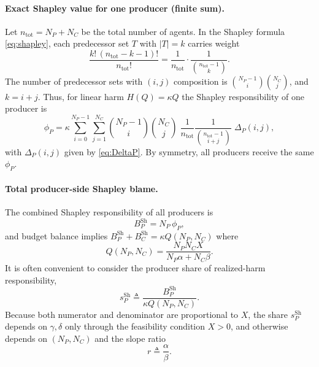 \documentclass[journal, a4paper]{IEEEtran}
\begin{document}
\paragraph{Exact Shapley value for one producer (finite sum).}
Let $n_{\mathrm{tot}}=N_P+N_C$ be the total number of agents. In the Shapley formula \eqref{eq:shapley}, each predecessor set $T$ with $|T|=k$ carries weight
\begin{equation}
\frac{k!\,(n_{\mathrm{tot}}-k-1)!}{n_{\mathrm{tot}}!}
=\frac{1}{n_{\mathrm{tot}}}\cdot\frac{1}{\binom{n_{\mathrm{tot}}-1}{k}}.
\label{eq:shapley_weight_binom}
\end{equation}
The number of predecessor sets with $(i,j)$ composition is $\binom{N_P-1}{i}\binom{N_C}{j}$, and $k=i+j$. Thus, for linear harm $H(Q)=\kappa Q$ the Shapley responsibility of one producer is
\begin{equation}
\phi_P
=
\kappa\sum_{i=0}^{N_P-1}\sum_{j=1}^{N_C}
\binom{N_P-1}{i}\binom{N_C}{j}\;
\frac{1}{n_{\mathrm{tot}}}\frac{1}{\binom{n_{\mathrm{tot}}-1}{i+j}}\;
\Delta_P(i,j),
\label{eq:phiP_general}
\end{equation}
with $\Delta_P(i,j)$ given by \eqref{eq:DeltaP}. By symmetry, all producers receive the same $\phi_P$.

\paragraph{Total producer-side Shapley blame.}
The combined Shapley responsibility of all producers is
\begin{equation}
B_P^{\mathrm{Sh}}=N_P\,\phi_P,
\label{eq:BPSh_def}
\end{equation}
and budget balance implies $B_P^{\mathrm{Sh}}+B_C^{\mathrm{Sh}}=\kappa Q(N_P,N_C)$ where
\begin{equation}
Q(N_P,N_C)=\frac{N_PN_CX}{N_P\alpha+N_C\beta}.
\label{eq:Q_grand}
\end{equation}
It is often convenient to consider the producer share of realized-harm responsibility,
\begin{equation}
s_P^{\mathrm{Sh}}
\triangleq
\frac{B_P^{\mathrm{Sh}}}{\kappa Q(N_P,N_C)}.
\label{eq:sP_def}
\end{equation}
Because both numerator and denominator are proportional to $X$, the share $s_P^{\mathrm{Sh}}$ depends on $\gamma,\delta$ only through the feasibility condition $X>0$, and otherwise depends on $(N_P,N_C)$ and the slope ratio
\begin{equation}
r\triangleq \frac{\alpha}{\beta}.
\label{eq:r_def}
\end{equation}
\end{document}
